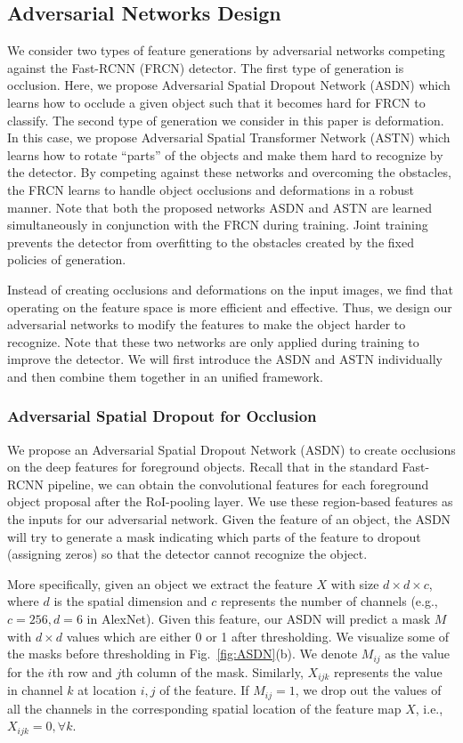 \documentclass[10pt,twocolumn,letterpaper]{article}
\begin{document}
\subsection{Adversarial Networks Design}
We consider two types of feature generations by adversarial networks competing against the Fast-RCNN (FRCN) detector. The first type of generation is occlusion. Here, we propose Adversarial Spatial Dropout Network (ASDN) which learns how to occlude a given object such that it becomes hard for FRCN to classify. The second type of generation we consider in this paper is deformation. In this case, we propose Adversarial Spatial Transformer Network (ASTN) which learns how to rotate ``parts'' of the objects and make them hard to recognize by the detector. By competing against these networks and overcoming the obstacles, the FRCN learns  to handle object occlusions and deformations in a robust manner. Note that both the proposed networks ASDN and ASTN are learned simultaneously in conjunction with the FRCN during training. Joint training prevents the detector from overfitting to the obstacles created by the fixed policies of generation. 

Instead of creating occlusions and deformations on the input images, we find that operating on the feature space is more efficient and effective. Thus, we design our adversarial networks to modify the features to make the object harder to recognize. Note that these two networks are only applied during training to improve the detector. We will first introduce the ASDN and ASTN individually and then combine them together in an unified framework. 


\subsubsection{Adversarial Spatial Dropout for Occlusion}
We propose an Adversarial Spatial Dropout Network (ASDN) to create occlusions on the deep features for foreground objects. Recall that in the standard Fast-RCNN pipeline, we can obtain the convolutional features for each foreground object proposal after the RoI-pooling layer. We use these region-based features as the inputs for our adversarial network. Given the feature of an object, the ASDN will try to generate a mask indicating which parts of the feature to dropout (assigning zeros) so that the detector cannot recognize the object.

More specifically, given an object we extract the feature $X$ with size $d \times d \times c$, where $d$ is the spatial dimension and  $c$ represents the number of channels (e.g., $c=256, d=6$ in AlexNet). Given this feature, our ASDN will predict a mask $M$ with $d \times d$ values which are either 0 or 1 after thresholding. We visualize some of the masks before thresholding in Fig.~\ref{fig:ASDN}(b). We denote $M_{ij}$ as the value for the $i$th row and $j$th column of the mask. Similarly, $X_{ijk}$ represents the value in channel $k$ at location $i,j$ of the feature. If $M_{ij} = 1$, we drop out the values of all the channels in the corresponding spatial location of the feature map $X$, i.e., $X_{ijk} = 0, \forall k$. 
\end{document}

